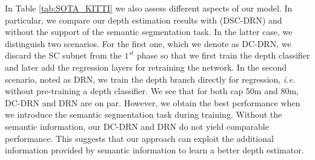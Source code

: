 \documentclass[letterpaper, 10 pt, conference]{ieeeconf}
\newcommand{\ie}{{\em i.e.}}
\newcommand{\Tab}[1]{Table \ref{tab:#1}}
\begin{document}
In \Tab{SOTA_KITTI} we also assess different aspects of our model. In particular, we compare our depth estimation results with (DSC-DRN) and without the support of the semantic segmentation task. In the latter case, we distinguish two scenarios. For the first one, which we denote as DC-DRN, we discard the SC subnet from the $1^{st}$ phase so that we first train the depth classifier and later add the regression layers for retraining the network. In the second scenario, noted as DRN, we train the depth branch directly for regression, {\ie} without pre-training a depth classifier. We see that for both cap 50m and 80m, DC-DRN and DRN are on par. However, we obtain the best performance when we introduce the semantic segmentation task during training. Without the semantic information, our DC-DRN and DRN do not yield comparable performance. This suggests that our approach can exploit the additional information provided by semantic information to learn a better depth estimator.


\newcommand{\commentA}{}

\renewrobustcmd{\boldmath}{}
\newrobustcmd{\B}{\bfseries}
\newrobustcmd{\IL}{\itshape}
\addtolength{\tabcolsep}{-4.1pt}
\end{document}

